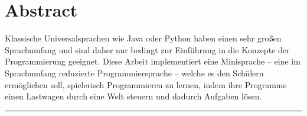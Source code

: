 \chapter*{Abstract}
\label{sec:abstract}

Klassische Universalsprachen wie Java oder Python haben einen sehr großen Sprachumfang und sind daher nur bedingt zur Einführung in die Konzepte der Programmierung geeignet. Diese Arbeit implementiert eine Minisprache – eine im Sprachumfang reduzierte Programmiersprache – welche es den Schülern ermöglichen soll, spielerisch Programmieren zu lernen, indem ihre Programme einen Lastwagen durch eine Welt steuern und dadurch Aufgaben lösen.

\rule{\textwidth}{1pt}


